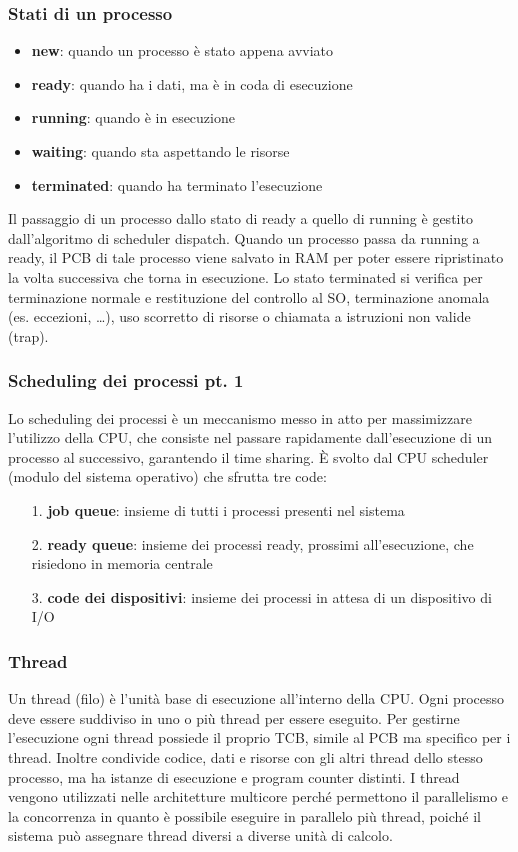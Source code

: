 \documentclass[a4paper]{article}
\begin{document}
\subsubsection*{Stati di un processo}
\begin{itemize}
	\item \textbf{new}: quando un processo è stato appena avviato
	\item \textbf{ready}: quando ha i dati, ma è in coda di esecuzione
	\item \textbf{running}: quando è in esecuzione
	\item \textbf{waiting}: quando sta aspettando le risorse
	\item \textbf{terminated}: quando ha terminato l'esecuzione
\end{itemize}
Il passaggio di un processo dallo stato di ready a quello di running è gestito dall'algoritmo di scheduler dispatch. Quando un
processo passa da running a ready, il PCB di tale processo viene salvato in RAM per poter essere ripristinato la volta successiva
che torna in esecuzione. Lo stato terminated si verifica per terminazione normale e restituzione del controllo al SO, terminazione
anomala (es. eccezioni, \dots), uso scorretto di risorse o chiamata a istruzioni non valide (trap).

\subsubsection*{Scheduling dei processi pt. 1}
Lo scheduling dei processi è un meccanismo messo in atto per massimizzare l’utilizzo della CPU, che consiste nel passare
rapidamente dall’esecuzione di un processo al successivo, garantendo il time sharing. È svolto dal CPU scheduler (modulo del
sistema operativo) che sfrutta tre code:
\begin{itemize}
	\item[1.] \textbf{job queue}: insieme di tutti i processi presenti nel sistema
	\item[2.] \textbf{ready queue}: insieme dei processi ready, prossimi all'esecuzione, che risiedono in memoria centrale
	\item[3.] \textbf{code dei dispositivi}: insieme dei processi in attesa di un dispositivo di I/O
\end{itemize}

\subsubsection*{Thread}
Un thread (filo) è l'unità base di esecuzione all'interno della CPU. Ogni processo deve essere suddiviso in uno o più thread per
essere eseguito. Per gestirne l'esecuzione ogni thread possiede il proprio TCB, simile al PCB ma specifico per i thread. Inoltre
condivide codice, dati e risorse con gli altri thread dello stesso processo, ma ha istanze di esecuzione e program counter distinti.
I thread vengono utilizzati nelle architetture multicore perché permettono il parallelismo e la concorrenza in quanto è possibile
eseguire in parallelo più thread, poiché il sistema può assegnare thread diversi a diverse unità di calcolo.
\end{document}
